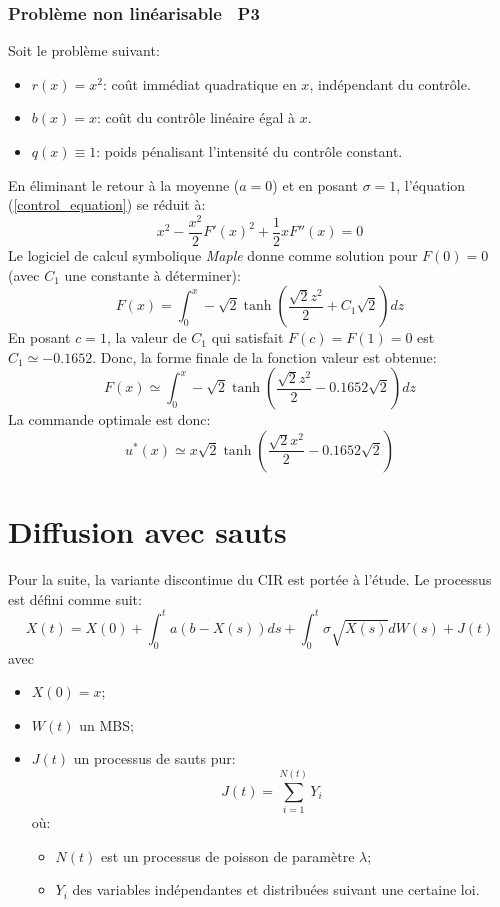 \subsubsection{Problème non linéarisable \textemdash~P3}\label{p3}
Soit le problème suivant:
\begin{itemize}
    \item $r(x) = x^2$: coût immédiat quadratique en $x$, indépendant du contrôle.
    \item $b(x) = x$: coût du contrôle linéaire égal à $x$.
    \item $q(x) \equiv 1$: poids pénalisant l'intensité du contrôle constant.
\end{itemize}
En éliminant le retour à la moyenne ($a=0$) et en posant $\sigma=1$, l'équation (\ref{control_equation}) se réduit à:
\begin{equation}\label{reduced_control_equation}
    x^2-\frac{x^2}{2}{F'(x)}^2+\frac{1}{2}xF''(x)=0
\end{equation}
Le logiciel de calcul symbolique \textit{Maple} donne comme solution pour $F(0)=0$ (avec $C_1$ une constante à déterminer):
\[
    F(x)=\int_0^x-\sqrt{2}\tanh\left(\frac{\sqrt{2}z^2}{2}+C_1\sqrt{2}\right)dz
\]
En posant $c=1$, la valeur de $C_1$ qui satisfait $F(c)=F(1)=0$ est $C_1\simeq -0.1652$. Donc, la forme finale de la fonction valeur est obtenue:
\begin{equation}\label{sol_control_3}
    F(x)\simeq \int_0^x-\sqrt{2}\tanh\left(\frac{\sqrt{2}z^2}{2}-0.1652\sqrt{2}\right)dz
\end{equation}
La commande optimale est donc:
\begin{equation}\label{optimal_control_3}
    u^*(x)\simeq x\sqrt{2}\tanh\left(\frac{\sqrt{2}x^2}{2}-0.1652\sqrt{2}\right)
\end{equation}

\section{Diffusion avec sauts}
Pour la suite, la variante discontinue du \acs{CIR} est portée à l'étude. Le processus est défini comme suit:
\begin{equation}\label{jump_cir_sde}
    X(t)=X(0)+\int_0^t a(b-X(s))ds+\int_0^t\sigma\sqrt{X(s)}dW(s)+J(t)
\end{equation}
avec
\begin{itemize}
    \item $X(0)=x$;
    \item $W(t)$ un \acs{MBS};
    \item $J(t)$ un processus de sauts pur:
    \[
    J(t)=\sum_{i=1}^{N(t)}Y_i
    \]
    où:
    \begin{itemize}
        \item $N(t)$ est un processus de poisson de paramètre $\lambda$;
        \item $Y_i$ des variables indépendantes et distribuées suivant une certaine loi.
    \end{itemize}
\end{itemize}

